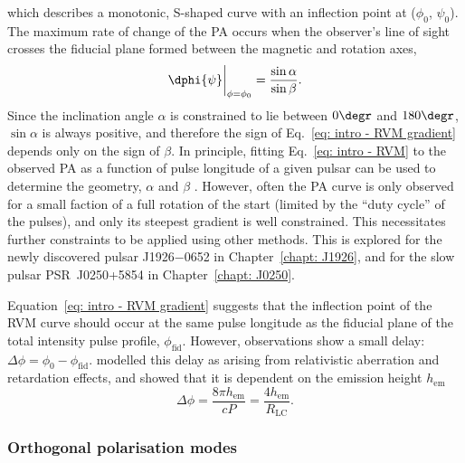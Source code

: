 which describes a monotonic, S-shaped curve with an inflection point at ($\phi_0$, $\psi_0$). The maximum rate of change of the PA occurs when the observer's line of sight crosses the fiducial plane formed between the magnetic and rotation axes,
\begin{equation}
    \label{eq: intro - RVM gradient}
    \dphi{\psi}\bigg|_{\phi=\phi_0} = \frac{\sin\alpha}{\sin\beta}.
\end{equation}
Since the inclination angle $\alpha$ is constrained to lie between $0\degr$ and $180\degr$, $\sin\alpha$ is always positive, and therefore the sign of Eq.~\eqref{eq: intro - RVM gradient} depends only on the sign of $\beta$. In principle, fitting Eq.~\eqref{eq: intro - RVM} to the observed PA as a function of pulse longitude of a given pulsar can be used to determine the geometry, $\alpha$ and $\beta$ \citep[e.g.][]{EWxx2001, JWxx2006,RWJx2015a}. However, often the PA curve is only observed for a small faction of a full rotation of the start (limited by the ``duty cycle'' of the pulses), and only its steepest gradient is well constrained. This necessitates further constraints to be applied using other methods. This is explored for the newly discovered pulsar J1926$-$0652 in Chapter~\ref{chapt: J1926}, and for the slow pulsar PSR~J0250+5854 in Chapter~\ref{chapt: J0250}.

Equation~\eqref{eq: intro - RVM gradient} suggests that the inflection point of the RVM curve should occur at the same pulse longitude as the fiducial plane of the total intensity pulse profile, $\phi_\mathrm{fid}$. However, observations show a small delay: $\Delta\phi = \phi_0 - \phi_\mathrm{fid}$. \citet{BCWx1991} modelled this delay as arising from relativistic aberration and retardation effects, and showed that it is dependent on the emission height $h_\mathrm{em}$
\begin{equation}
    \label{eq: intro - BCW shift}
    \Delta\phi = \frac{8\pi h_\mathrm{em}}{cP} = \frac{4h_\mathrm{em}}{R_\mathrm{LC}}.
\end{equation}

\subsubsection*{Orthogonal polarisation modes}
\label{sec: intro - emission models - polarisation - OPMs}

